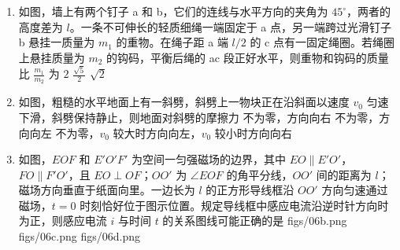 \documentclass[\gkver]{gaokaozhenti}
\begin{document}
\begin{enumerate}
\item
如图，墙上有两个钉子 a 和 b，它们的连线与水平方向的夹角为 $45^\circ$，两者的高度差为 $l$。一条不可伸长的轻质细绳一端固定于 a 点，另一端跨过光滑钉子 b 悬挂一质量为 $m_{1}$ 的重物。在绳子距 a 端 $l/2$ 的 c 点有一固定绳圈。若绳圈上悬挂质量为 $m_{2}$ 的钩码，平衡后绳的 ac 段正好水平，则重物和钩码的质量比 $\frac{m_{1}}{m_{2}}$ 为
{$2$}
{$\frac{\sqrt{5}}{2}$}
{$\sqrt{2}$}


\item
如图，粗糙的水平地面上有一斜劈，斜劈上一物块正在沿斜面以速度 $v_{0}$ 匀速下滑，斜劈保持静止，则地面对斜劈的摩擦力
{不为零，方向向右}
{不为零，方向向左}
{不为零，$v_{0}$ 较大时方向向左，$v_{0}$ 较小时方向向右}


\item
如图，$EOF$ 和 $E'O'F'$ 为空间一匀强磁场的边界，其中 $EO\parallel E'O'$，$FO\parallel F'O'$，且 $EO\perp OF$；$OO'$ 为 $\angle EOF$ 的角平分线，$OO'$ 间的距离为 $l$；磁场方向垂直于纸面向里。一边长为 $l$ 的正方形导线框沿 $OO'$ 方向匀速通过磁场，$t=0$ 时刻恰好位于图示位置。规定导线框中感应电流沿逆时针方向时为正，则感应电流 $i$ 与时间 $t$ 的关系图线可能正确的是
{figs/06b.png}
{figs/06c.png}
{figs/06d.png}


\end{enumerate}
\end{document}
